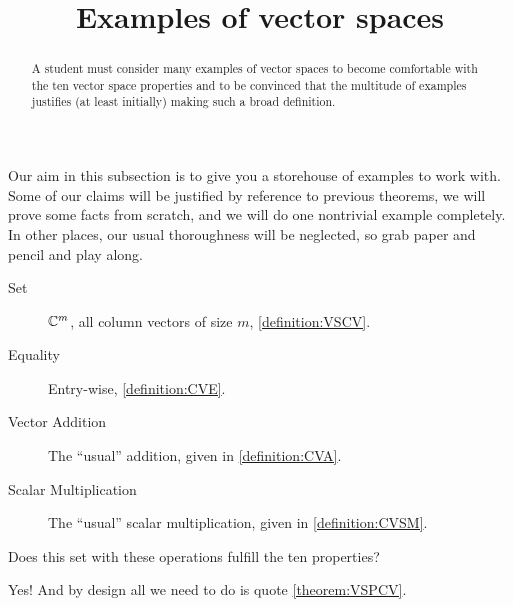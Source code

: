 \documentclass{ximera}
\title{Examples of vector spaces}
\begin{document}
\begin{abstract}
  A student must consider many examples of vector spaces to become
  comfortable with the ten vector space properties and to be convinced
  that the multitude of examples justifies (at least initially) making
  such a broad definition.
\end{abstract}
\maketitle

Our aim in this subsection is to give you a storehouse of examples to
work with.  Some of our claims will be justified by reference to
previous theorems, we will prove some facts from scratch, and we will
do one nontrivial example completely.  In other places, our usual
thoroughness will be neglected, so grab paper and pencil and play
along.

\begin{example}

  \begin{description}
  \item[Set] $\mathbb{C}^{m}$, all column vectors of size $m$, \ref{definition:VSCV}.
  \item[Equality] Entry-wise, \ref{definition:CVE}.
  \item[Vector Addition] The ``usual'' addition, given in \ref{definition:CVA}.
  \item[Scalar Multiplication] The ``usual'' scalar multiplication, given in \ref{definition:CVSM}.
  \end{description}
  
  Does this set with these operations fulfill the ten properties?  
  \begin{multipleChoice}
  \end{multipleChoice}
  
  \begin{feedback}[correct]
    Yes!  And by design all we need to do is quote \ref{theorem:VSPCV}.
  \end{feedback}
\end{example}
\end{document}

